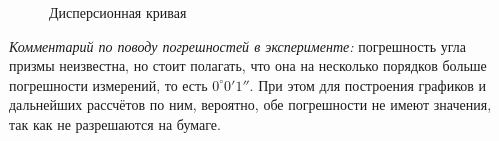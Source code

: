 \documentclass[a4paper, 12pt]{article}%
\newcommand*{\ShowIntersection}{
		\fill 
		[name intersections={of=GraphCurve and l1, name=i, total=\t}] 
		[green!20!black, opacity=1, every node/.style={above left, black, opacity=1}] 
		\foreach \s in {1,...,\t}{(i-\s) circle (2pt)
			node [above right] {1}};
	}
\newcommand*{\ShowIntersectionn}{
	\fill 
	[name intersections={of=GraphCurve and l2, name=i, total=\t}] 
	[green!20!black, opacity=1, every node/.style={above left, black, opacity=1}] 
	\foreach \s in {1,...,\t}{(i-\s) circle (2pt)
		node [above right] {2}};
}
\newcommand*{\ShowIntersectionnn}{
	\fill 
	[name intersections={of=GraphCurve and l3, name=i, total=\t}] 
	[green!20!black, opacity=1, every node/.style={above left, black, opacity=1}] 
	\foreach \s in {1,...,\t}{(i-\s) circle (2pt)
		node [above right] {3}};
}
\begin{document}
\begin{enumerate}
\begin{figure}[!htb]
		\caption{Дисперсионная кривая}
	\end{figure}
	
	\textit{Комментарий по поводу погрешностей в эксперименте:} погрешность угла призмы неизвестна, но стоит полагать, что она на несколько порядков больше погрешности измерений, то есть $0^\circ0'1''$. При этом для построения графиков и дальнейших рассчётов по ним, вероятно, обе погрешности не имеют значения, так как не разрешаются на бумаге.
	

\end{enumerate}
\end{document}
